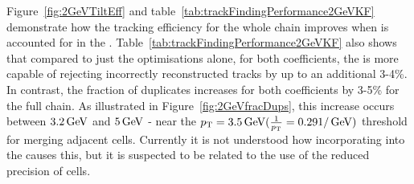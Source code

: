 \begin{table}[htbp]
\label{tab:trackFindingPerformance2GeVKF}
\centering
\end{table}

Figure~\ref{fig:2GeVTiltEff} and table~\ref{tab:trackFindingPerformance2GeVKF} demonstrate how the tracking efficiency for the whole chain improves when \MS is accounted for in the \KF.
Table~\ref{tab:trackFindingPerformance2GeVKF} also shows that compared to just the \HT optimisations alone, for both \MS coefficients, the \KF is more capable of rejecting incorrectly reconstructed tracks by up to an additional 3-4\%.
In contrast, the fraction of duplicates increases for both coefficients by 3-5\% for the full chain.
As illustrated in Figure~\ref{fig:2GeVfracDups}, this increase occurs between $3.2\,\text{Ge\hspace{-.08em}V}$ and $5\,\text{Ge\hspace{-.08em}V}$ - near the $p_{\mathrm{T}} = 3.5\,\text{Ge\hspace{-.08em}V} (\frac{1}{p_{\mathrm{T}}} = 0.29 1/\,\text{Ge\hspace{-.08em}V})$ threshold for merging adjacent \HT cells.
Currently it is not understood how incorporating \MS into the \KF causes this, but it is suspected to be related to the use of the reduced precision of \HT cells.

